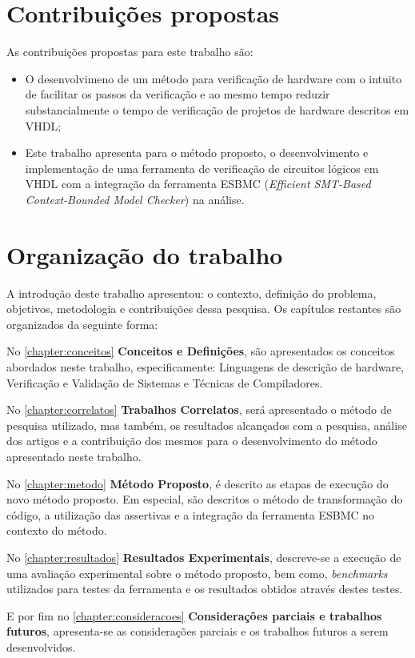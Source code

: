 \section{Contribuições propostas}

As contribuições propostas para este trabalho são:
\begin{itemize}
  \item O desenvolvimeno de um método para verificação de hardware com o intuito de facilitar os passos da verificação e ao mesmo tempo reduzir substancialmente o tempo de verificação de projetos de hardware descritos em VHDL;
  \item Este trabalho apresenta para o método proposto, o desenvolvimento e implementação de uma ferramenta de verificação de circuitos lógicos em VHDL com a integração da ferramenta ESBMC (\textit{Efficient SMT-Based Context-Bounded Model Checker})\cite{cordeiro2012smt} na análise.
\end{itemize}


\section{Organização do trabalho}
A introdução deste trabalho apresentou: o contexto, definição do problema, objetivos, metodologia e contribuições dessa pesquisa. Os capítulos restantes são organizados da seguinte forma:

\par
No \autoref{chapter:conceitos} \textbf{Conceitos e Definições}, são apresentados os conceitos abordados neste trabalho, especificamente: Linguagens de descrição de hardware, Verificação e Validação de Sistemas e Técnicas de Compiladores.

\par
No \autoref{chapter:correlatos} \textbf{Trabalhos Correlatos}, será apresentado o método de pesquisa utilizado, mas também, os resultados alcançados com a pesquisa, análise dos artigos e a contribuição dos mesmos para o desenvolvimento do método apresentado neste trabalho.

\par
No \autoref{chapter:metodo} \textbf{Método Proposto}, é descrito as etapas de execução do novo método proposto. Em especial, são descritos o método de transformação do código, a utilização das assertivas e a integração da ferramenta ESBMC no contexto do método.

\par
No \autoref{chapter:resultados} \textbf{Resultados Experimentais}, descreve-se a execução de uma avaliação experimental sobre o método proposto, bem como, 
\textit{benchmarks} utilizados para testes da ferramenta e os resultados obtidos através destes testes.
\par
E por fim no \autoref{chapter:consideracoes} \textbf{Considerações parciais e trabalhos futuros}, apresenta-se as considerações parciais e os trabalhos futuros a serem desenvolvidos. 
